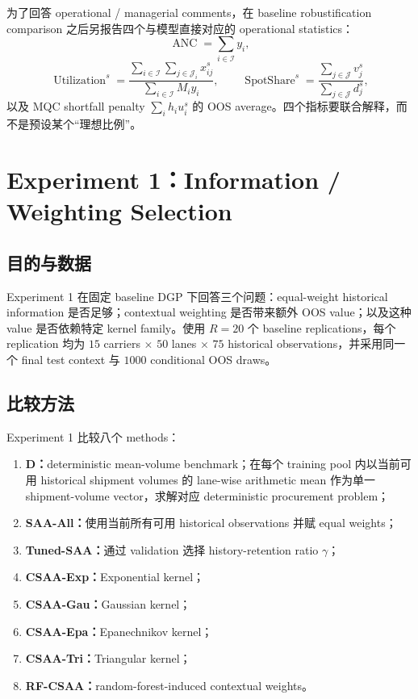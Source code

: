 \documentclass[11pt,a4paper]{ctexart}
\newcommand{\I}{\mathcal I}
\newcommand{\J}{\mathcal J}
\begin{document}
为了回答 operational / managerial comments，在 baseline robustification comparison 之后另报告四个与模型直接对应的 operational statistics：
\[
\operatorname{ANC}=\sum_{i\in\I}y_i,
\]
\[
\operatorname{Utilization}^{s}
=\frac{\sum_{i\in\I}\sum_{j\in\J_i}x_{ij}^{s}}
{\sum_{i\in\I}M_i y_i},
\qquad
\operatorname{SpotShare}^{s}
=\frac{\sum_{j\in\J}v_j^{s}}
{\sum_{j\in\J}d_j^{s}},
\]
以及 MQC shortfall penalty $\sum_i h_i u_i^s$ 的 OOS average。四个指标要联合解释，而不是预设某个“理想比例”。

\section{Experiment 1：Information / Weighting Selection}

\subsection{目的与数据}

Experiment 1 在固定 baseline DGP 下回答三个问题：equal-weight historical information 是否足够；contextual weighting 是否带来额外 OOS value；以及这种 value 是否依赖特定 kernel family。使用 $R=20$ 个 baseline replications，每个 replication 均为 $15$ carriers $\times$ $50$ lanes $\times$ $75$ historical observations，并采用同一个 final test context 与 $1000$ conditional OOS draws。

\subsection{比较方法}

Experiment 1 比较八个 methods：
\begin{enumerate}[leftmargin=2.4em,itemsep=0.18em]
\item \textbf{D：}deterministic mean-volume benchmark；在每个 training pool 内以当前可用 historical shipment volumes 的 lane-wise arithmetic mean 作为单一 shipment-volume vector，求解对应 deterministic procurement problem；
\item \textbf{SAA-All：}使用当前所有可用 historical observations 并赋 equal weights；
\item \textbf{Tuned-SAA：}通过 validation 选择 history-retention ratio $\gamma$；
\item \textbf{CSAA-Exp：}Exponential kernel；
\item \textbf{CSAA-Gau：}Gaussian kernel；
\item \textbf{CSAA-Epa：}Epanechnikov kernel；
\item \textbf{CSAA-Tri：}Triangular kernel；
\item \textbf{RF-CSAA：}random-forest-induced contextual weights。
\end{enumerate}
\end{document}
